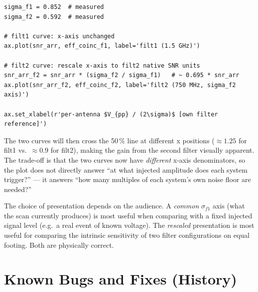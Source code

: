 \documentclass[11pt,letterpaper]{article}
\newenvironment{codebox}{%
  \begin{mdframed}[backgroundcolor=codebg,linewidth=0.5pt,innerleftmargin=6pt,innerrightmargin=6pt,innertopmargin=4pt,innerbottommargin=4pt]%
  \small}{\end{mdframed}}
\newenvironment{notebox}{%
  \begin{mdframed}[backgroundcolor=notebg,linewidth=0.5pt,frametitle={\small\textbf{Note}},innerleftmargin=6pt]}%
  {\end{mdframed}}}
\begin{document}
\begin{codebox}
\begin{Verbatim}
sigma_f1 = 0.852  # measured
sigma_f2 = 0.592  # measured

# filt1 curve: x-axis unchanged
ax.plot(snr_arr, eff_coinc_f1, label='filt1 (1.5 GHz)')

# filt2 curve: rescale x-axis to filt2 native SNR units
snr_arr_f2 = snr_arr * (sigma_f2 / sigma_f1)   # ~ 0.695 * snr_arr
ax.plot(snr_arr_f2, eff_coinc_f2, label='filt2 (750 MHz, sigma_f2 axis)')

ax.set_xlabel(r'per-antenna $V_{pp} / (2\sigma)$ [own filter reference]')
\end{Verbatim}
\end{codebox}

The two curves will then cross the 50\,\% line at different x positions
($\approx 1.25$ for filt1 vs.\ $\approx 0.9$ for filt2), making the gain from
the second filter visually apparent.  The trade-off is that the two curves now
have \emph{different} x-axis denominators, so the plot does not directly answer
``at what injected amplitude does each system trigger?'' --- it answers ``how
many multiples of each system's own noise floor are needed?''

\begin{notebox}
The choice of presentation depends on the audience.  A \emph{common} $\sigma_{f1}$
axis (what the scan currently produces) is most useful when comparing with a
fixed injected signal level (e.g.\ a real event of known voltage). The
\emph{rescaled} presentation is most useful for comparing the intrinsic
sensitivity of two filter configurations on equal footing.  Both are physically
correct.
\end{notebox}

\section{Known Bugs and Fixes (History)}
\end{document}
